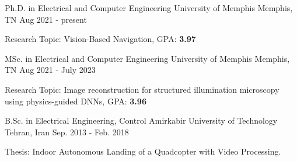 

\begin{cventries}

\cventry
    {Ph.D. in Electrical and Computer Engineering} %
    {University of Memphis} %
    {Memphis, TN} %
    {Aug 2021 - present} %
    {
      \begin{cvitems} %
        \item {Research Topic: Vision-Based Navigation, GPA: \textbf{3.97}}
      \end{cvitems}
    }
    
  \cventry
    {MSc. in Electrical and Computer Engineering} %
    {University of Memphis} %
    {Memphis, TN} %
    {Aug 2021 - July 2023} %
    {
      \begin{cvitems} %
        \item {Research Topic: Image reconstruction for structured illumination microscopy using physics-guided DNNs, GPA: \textbf{3.96}}
      \end{cvitems}
    }
    
  \cventry
    {B.Sc. in Electrical Engineering, Control} %
    {Amirkabir University of Technology} %
    {Tehran, Iran} %
    {Sep. 2013 - Feb. 2018} %
    {
      \begin{cvitems} %
        \item {Thesis: Indoor Autonomous Landing of a Quadcopter with Video Processing.} 
      \end{cvitems}
        }
    
\end{cventries}
